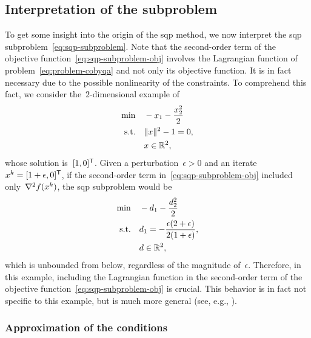 \subsection{Interpretation of the subproblem}

To get some insight into the origin of the \gls{sqp} method, we now interpret the \gls{sqp} subproblem~\cref{eq:sqp-subproblem}.
Note that the second-order term of the objective function~\cref{eq:sqp-subproblem-obj} involves the Lagrangian function of problem~\cref{eq:problem-cobyqa} and not only its objective function.
It is in fact necessary due to the possible nonlinearity of the constraints.
To comprehend this fact, we consider the~$2$-dimensional example of \citeauthor{Boggs_Tolle_1995}~\cite{Boggs_Tolle_1995}
\begin{align*}
    \min        & \quad -x_1 - \frac{x_2^2}{2}\\
    \text{s.t.} & \quad \norm{x}^2 - 1 = 0,\\
                & \quad \iter \in \R^2,
\end{align*}
whose solution is~$[1, 0]^{\mathsf{T}}$.
Given a perturbation~$\epsilon > 0$ and an iterate~$\iter[k] = [1 + \epsilon, 0]^{\T}$, if the second-order term in~\cref{eq:sqp-subproblem-obj} included only~$\nabla^2 \obj(\iter[k])$, the \gls{sqp} subproblem would be
\begin{align*}
    \min        & \quad -\step_1 - \frac{\step_2^2}{2}\\
    \text{s.t.} & \quad \step_1 = -\frac{\epsilon (2 + \epsilon)}{2 (1 + \epsilon)},\\
                & \quad \step \in \R^2,
\end{align*}
which is unbounded from below, regardless of the magnitude of~$\epsilon$.
Therefore, in this example, including the Lagrangian function in the second-order term of the objective function~\cref{eq:sqp-subproblem-obj} is crucial.
This behavior is in fact not specific to this example, but is much more general (see, e.g., \cite[ch.~18]{Nocedal_Wright_2006}).

\subsubsection{Approximation of the  conditions}

